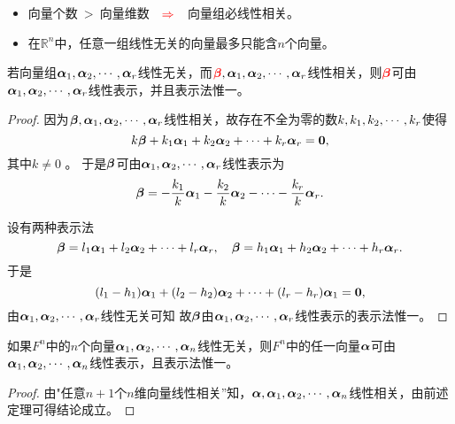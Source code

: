 \begin{frame}
\begin{zhu*}
  \begin{itemize}
  \item    向量个数$~>~$向量维数 $~~\textcolor{red}{\Rightarrow}~~$ 向量组必线性相关。 
  \item     在$\mathbb R^n$中，任意一组线性无关的向量最多只能含$n$个向量。
  \end{itemize}
\end{zhu*}
\end{frame}

\begin{frame}
\begin{dingli}
  若向量组$\boldsymbol{\alpha}_1,\boldsymbol{\alpha}_2,\cdots,\boldsymbol{\alpha}_r$线性无关，而$\textcolor{red}{\boldsymbol{\beta}},\boldsymbol{\alpha}_1,\boldsymbol{\alpha}_2,\cdots,\boldsymbol{\alpha}_r$线性相关，则$\textcolor{red}{\boldsymbol{\beta}}$可由$\boldsymbol{\alpha}_1,\boldsymbol{\alpha}_2,\cdots,\boldsymbol{\alpha}_r$线性表示，并且表示法惟一。
\end{dingli} 
\end{frame}

\begin{frame}
\begin{proof}
因为$\boldsymbol{\beta},\boldsymbol{\alpha}_1,\boldsymbol{\alpha}_2,\cdots,\boldsymbol{\alpha}_r$线性相关，故存在不全为零的数$k,k_1,k_2,\cdots,k_r$使得
$$
k\boldsymbol{\beta} + k_1\boldsymbol{\alpha}_1+k_2\boldsymbol{\alpha}_2+\cdots+k_r\boldsymbol{\alpha}_r=\boldsymbol{0},
$$
其中$k\ne 0 $ 。  
于是$\boldsymbol{\beta}$可由$\boldsymbol{\alpha}_1,\boldsymbol{\alpha}_2,\cdots,\boldsymbol{\alpha}_r$线性表示为
$$
\boldsymbol{\beta}=-\frac{k_1}k\boldsymbol{\alpha}_1-\frac{k_2}k\boldsymbol{\alpha}_2-\cdots-\frac{k_r}k\boldsymbol{\alpha}_r.
$$ \pause 

 \quad 设有两种表示法
$$
\boldsymbol{\beta}=l_1\boldsymbol{\alpha}_1+l_2\boldsymbol{\alpha}_2+\cdots+l_r\boldsymbol{\alpha}_r,\quad
\boldsymbol{\beta}=h_1\boldsymbol{\alpha}_1+h_2\boldsymbol{\alpha}_2+\cdots+h_r\boldsymbol{\alpha}_r.
$$ 
于是
$$
(l_1-h_1)\boldsymbol{\alpha}_1+(l_2-h_2)\boldsymbol{\alpha}_2+\cdots+(l_r-h_r)\boldsymbol{\alpha}_1=\boldsymbol{0},
$$ 
由$\boldsymbol{\alpha}_1,\boldsymbol{\alpha}_2,\cdots,\boldsymbol{\alpha}_r$线性无关可知
故$\boldsymbol{\beta}$由$\boldsymbol{\alpha}_1,\boldsymbol{\alpha}_2,\cdots,\boldsymbol{\alpha}_r$线性表示的表示法惟一。
\end{proof}
\end{frame}

\begin{frame}
\begin{tuilun}
  如果$F^n$中的$n$个向量$\boldsymbol{\alpha}_1,\boldsymbol{\alpha}_2,\cdots,\boldsymbol{\alpha}_n$线性无关，则$F^n$中的任一向量$\boldsymbol{\alpha}$可由$\boldsymbol{\alpha}_1,\boldsymbol{\alpha}_2,\cdots,\boldsymbol{\alpha}_n$线性表示，且表示法惟一。
\end{tuilun}\pause 
\begin{proof}
由"任意$n+1$个$n$维向量线性相关''知，$\boldsymbol{\alpha},\boldsymbol{\alpha}_1,\boldsymbol{\alpha}_2,\cdots,\boldsymbol{\alpha}_n$线性相关，由前述定理可得结论成立。
\end{proof}
\end{frame}

